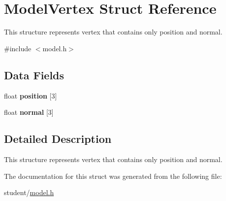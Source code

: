 \hypertarget{structModelVertex}{}\section{Model\+Vertex Struct Reference}
\label{structModelVertex}


This structure represents vertex that contains only position and normal.  




{\ttfamily \#include $<$model.\+h$>$}

\subsection*{Data Fields}
\begin{DoxyCompactItemize}
\item 
\hypertarget{structModelVertex_a6b1f493bc9e3714e304b1dfb8e59b6b1}{}float {\bfseries position} \mbox{[}3\mbox{]}\label{structModelVertex_a6b1f493bc9e3714e304b1dfb8e59b6b1}

\item 
\hypertarget{structModelVertex_acfc6311ee6c12f8fb61733a6fd2be6d9}{}float {\bfseries normal} \mbox{[}3\mbox{]}\label{structModelVertex_acfc6311ee6c12f8fb61733a6fd2be6d9}

\end{DoxyCompactItemize}


\subsection{Detailed Description}
This structure represents vertex that contains only position and normal. 

The documentation for this struct was generated from the following file\+:\begin{DoxyCompactItemize}
\item 
student/\hyperlink{model_8h}{model.\+h}\end{DoxyCompactItemize}

